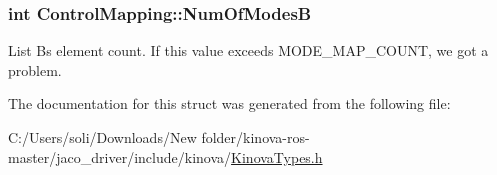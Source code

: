 \subsubsection[{\texorpdfstring{Num\+Of\+ModesB}{NumOfModesB}}]{\setlength{\rightskip}{0pt plus 5cm}int Control\+Mapping\+::\+Num\+Of\+ModesB}\hypertarget{struct_control_mapping_a07198eba22a0b4557eaec7ce5973a1c5}{}\label{struct_control_mapping_a07198eba22a0b4557eaec7ce5973a1c5}


List B\textquotesingle{}s element count. If this value exceeds M\+O\+D\+E\+\_\+\+M\+A\+P\+\_\+\+C\+O\+U\+NT, we got a problem. 



The documentation for this struct was generated from the following file\+:\begin{DoxyCompactItemize}
\item 
C\+:/\+Users/soli/\+Downloads/\+New folder/kinova-\/ros-\/master/jaco\+\_\+driver/include/kinova/\hyperlink{_kinova_types_8h}{Kinova\+Types.\+h}\end{DoxyCompactItemize}
